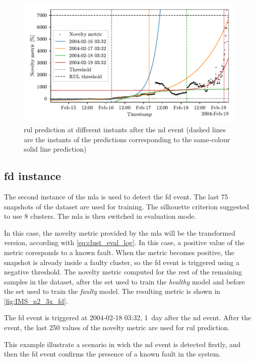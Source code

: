 \begin{figure}
    \centering
    \includegraphics[width=\textwidth]{images/IMS/Test02/RUL.pdf}
    \caption{\gls{rul} prediction at different instants after the \gls{nd} event (dashed lines are the instants of the predictions corresponding to the same-colour solid line prediction)}
    \label{fig:IMS_n2_3x_prediction}
\end{figure}

\subsection{\gls{fd} instance}
The second instance of the \gls{mla} is used to detect the \gls{fd} event. The last 75 snapshots of the dataset are used for training. The silhouette criterion suggested to use 8 clusters. The \gls{mla} is then switched in evaluation mode. 

In this case, the novelty metric provided by the \gls{mla} will be the transformed version, according with \autoref{eq:clust_eval_log}. In this case, a positive value of the metric coresponds to a known fault. When the metric becomes positive, the snapshot is already inside a faulty cluster, so the \gls{fd} event is triggered using a negative threshold. The novelty metric computed for the rest of the remaining samples in the dataset, after the set used to train the \emph{healthy} model and before the set used to train the \emph{faulty} model. The resulting metric is shown in \autoref{fig:IMS_n2_3x_fd}.

The \gls{fd} event is triggered at 2004-02-18 03:32, 1~day after the \gls{nd} event. After the event, the last 250 values of the novelty metric are used for \gls{rul} prediction. 

This example illustrate a scenario in wich the \gls{nd} event is detected firstly, and then the \gls{fd} event confirms the presence of a known fault in the system.

